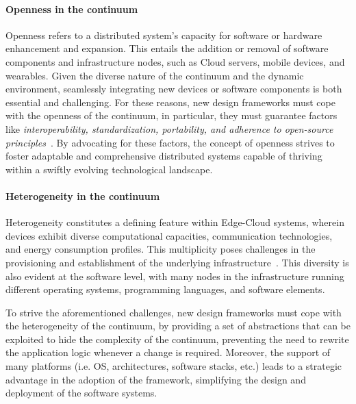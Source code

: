 \documentclass[12pt,a4paper]{article}
\begin{document}
\paragraph{Openness in the continuum}
Openness refers to a distributed system's capacity for software or hardware enhancement and expansion.
%
This entails the addition or removal of software components and infrastructure nodes,
such as Cloud servers, mobile devices, and wearables.
%
Given the diverse nature of the continuum and the dynamic environment,
seamlessly integrating new devices or software components is both essential and challenging.
%
For these reasons,
new design frameworks must cope with the openness of the continuum,
in particular,
they must guarantee factors like \emph{interoperability, standardization, portability, and adherence to open-source principles}~\cite{DBLP:journals/computing/SteenT16}.
%
By advocating for these factors,
the concept of openness strives to foster adaptable and comprehensive distributed systems capable of thriving within a swiftly evolving technological landscape.

\paragraph{Heterogeneity in the continuum}
Heterogeneity constitutes a defining feature within Edge-Cloud systems,
wherein devices exhibit diverse computational capacities,
communication technologies, and energy consumption profiles.
%
This multiplicity poses challenges in the provisioning and establishment of the underlying infrastructure~\cite{DBLP:conf/synasc/VladusicR20}.
%
This diversity is also evident at the software level,
with many nodes in the infrastructure running different operating systems,
programming languages,
and software elements.

To strive the aforementioned challenges,
new design frameworks must cope with the heterogeneity of the continuum,
by providing a set of abstractions that can be exploited to hide the complexity of the continuum,
preventing the need to rewrite the application logic whenever a change is required.
%
Moreover,
the support of many platforms (i.e. OS, architectures, software stacks, etc.) leads to a strategic advantage in the adoption of the framework,
simplifying the design and deployment of the software systems.
\end{document}
